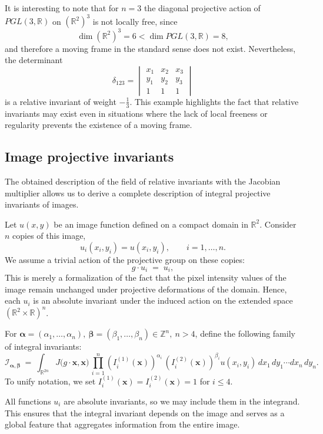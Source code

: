 \documentclass[12pt,reqno]{amsart}
\newcommand{\bs}{\boldsymbol}
\begin{document}
It is interesting to note that for $n=3$ the diagonal projective action of $PGL(3,\mathbb{R})$ on
$(\mathbb{R}^2)^3$ is not locally free, since
$$
\dim(\mathbb{R}^2)^3 = 6 < \dim PGL(3,\mathbb{R}) = 8,
$$
and therefore a moving frame in the standard sense does not exist.
Nevertheless, the determinant
$$
\delta_{123} =
\begin{vmatrix}
x_1 & x_2 & x_3 \\
y_1 & y_2 & y_3 \\
1   & 1   & 1
\end{vmatrix}
$$
is a relative invariant of weight $-\tfrac{1}{3}$.
This example highlights the fact that relative invariants may exist even in situations
where the lack of local freeness or regularity prevents the existence of a moving frame.


\subsection{Image projective invariants}

The obtained description of the field of relative invariants with the Jacobian multiplier allows us to derive a complete description of 
{integral projective invariants of images}.

Let $u(x,y)$ be an image function defined on a compact domain in $\mathbb{R}^2$.
Consider $n$ copies of this image,
\[
u_i(x_i,y_i) = u(x_i,y_i),\qquad i=1,\dots,n.
\]
We assume a {trivial} action of the projective group on these copies:
$$
g\cdot u_i \;=\; u_i,
$$
This is merely a formalization of the fact that the pixel intensity values of the image remain unchanged under projective deformations of the domain. Hence,
each \(u_i\) is an absolute invariant under the induced action on the extended space
\((\mathbb{R}^2\times\mathbb{R})^n\).

For $\bs \alpha =(\alpha_1, \ldots, \alpha_n),\ \bs \beta =(\beta_1, \ldots, \beta_n)\in \mathbb{Z}^{n},\ n>4$, define the following family of integral invariants:
\begin{equation*}
\mathcal I_{\bs \alpha, \bs \beta}\ =\ 
\int_{\mathbb{R}^{2n}}
J\bigl(g\!\cdot\!\bs x,\bs x\bigr)\,
\prod_{i=1}^{n} \left( I_i^{(1)}(\bs x)\right)^{\alpha_i}\, \left(I_i^{(2)}(\bs x)\right)^{\beta_i} u(x_i,y_i)\,
dx_1\,dy_1\cdots dx_n\,dy_n.
\end{equation*}
To unify notation, we set $ I_i^{(1)}(\bs x) = I_i^{(2)}(\bs x) = 1$ for $i \leq 4.$

All functions $u_i$ are absolute invariants, so we may include them in the integrand. This ensures that the integral invariant depends on the image and serves as a global feature that aggregates information from the entire image.
\end{document}
